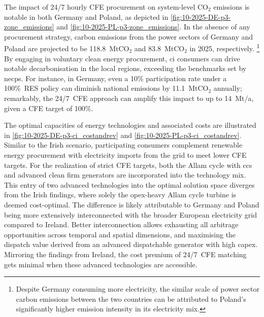 \documentclass[11pt, 5p, nopreprintline]{elsarticle}
\newcommand{\co}{\ce{CO2}}
\begin{document}
The impact of 24/7 hourly CFE procurement on system-level CO$_2$ emissions is notable in both Germany and Poland, as depicted in \cref{fig:10-2025-DE-p3-zone_emissions} and \cref{fig:10-2025-PL-p3-zone_emissions}.
In the absence of any procurement strategy, carbon emissions from the power sectors of Germany and Poland are projected to be 118.8~MtCO$_2$ and 83.8~MtCO$_2$ in 2025, respectively.%
\footnote{Despite Germany consuming more electricity, the similar scale of power sector carbon emissions between the two countries can be attributed to Poland's significantly higher emission intensity in its electricity mix.}
By engaging in voluntary clean energy procurement, \gls{ci} consumers can drive notable decarbonisation in the local regions, exceeding the benchmarks set by \gls{necp}s.
For instance, in Germany, even a 10\% participation rate under a 100\%~RES policy can diminish national emissions by 11.1~MtCO$_2$ annually; remarkably, the 24/7~CFE approach can amplify this impact to up to 14~Mt\co/a, given a CFE target of 100\%.

The optimal capacities of energy technologies and associated costs are illustrated in \cref{fig:10-2025-DE-p3-ci_costandrev} and \cref{fig:10-2025-PL-p3-ci_costandrev}.
Similar to the Irish scenario, participating consumers complement renewable energy procurement with electricity imports from the grid to meet lower CFE targets.
For the realization of strict CFE targets, both the Allam cycle with \gls{ccs} and advanced clean firm generators are incorporated into the technology mix.
This entry of two advanced technologies into the optimal solution space diverges from the Irish findings, where solely the \gls{opex}-heavy Allam cycle turbine is deemed cost-optimal.
The difference is likely attributable to Germany and Poland being more extensively interconnected with the broader European electricity grid compared to Ireland.
Better interconnection allows exhausting all arbitrage opportunities across temporal and spatial dimensions, and maximising the dispatch value derived from an advanced dispatchable generator with high \gls{capex}.
Mirroring the findings from Ireland, the cost premium of 24/7~CFE matching gets minimal when these advanced technologies are accessible.
\end{document}
